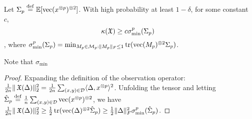 \begin{lemma}
Let $\Sigma_p \stackrel{\rm def}{=} \operatorname{\mathbb{E}}[\operatorname{vec}(x^{\otimes p})^{\otimes 2}]$.
With high probability at least $1-\delta$,
for some constant $c$,
$$\kappa(\operatorname{\mathfrak{X}}) \ge c \sigma_\text{min}^p(\Sigma_p)$$,
where
$\sigma_\text{min}^p(\Sigma_p) = \min_{M_p \in \mathcal{M}_p : \|M_p\|_F \le 1} \operatorname{tr}(\operatorname{vec}(M_p)^{\otimes 2} \Sigma_p)$.
\end{lemma}
Note that $\sigma_\text{min}$ 
\begin{proof}
Expanding the definition of the observation operator:
$\frac{1}{2n} \|\operatorname{\mathfrak{X}}(\Delta)\|_2^2
= \frac{1}{2n} \sum_{(x,y) \in \mathcal{D}} \langle \Delta, x^{\otimes p} \rangle^2$.
Unfolding the tensor and letting $\hat\Sigma_p \stackrel{\rm def}{=} \frac{1}{n} \sum_{(x,y) \in \mathcal{D}} \operatorname{vec}(x^{\otimes p})^{\otimes 2}$,
we have 
$\frac{1}{2n} \|\operatorname{\mathfrak{X}}(\Delta)\|_2^2
\ge \frac{1}{2} \operatorname{tr}(\operatorname{vec}(\Delta)^{\otimes 2} \hat\Sigma_p)
\ge \frac{1}{2} \|\Delta\|_F^2 \sigma_\text{min}^p(\hat\Sigma_p)$.

%
%  
%  
\end{proof}

